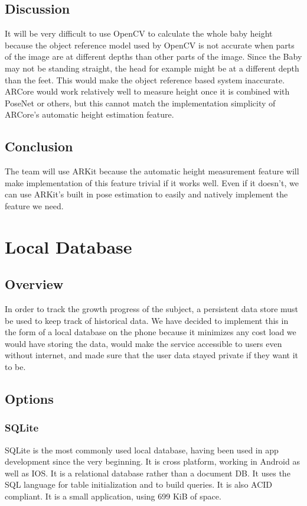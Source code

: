 \documentclass[onecolumn, draftclsnofoot,10pt, compsoc]{IEEEtran}
\begin{document}
\subsection{Discussion}
It will be very difficult to use OpenCV to calculate the whole baby height because the object reference model used by OpenCV is not accurate when parts of the image are at different depths than other parts of the image. Since the Baby may not be standing straight, the head for example might be at a different depth than the feet. This would make the object reference based system inaccurate. ARCore would work relatively well to measure height once it is combined with PoseNet or others, but this cannot match the implementation simplicity of ARCore's automatic height estimation feature.

\subsection{Conclusion}
The team will use ARKit because the automatic height measurement feature will make implementation of this feature trivial if it works well. Even if it doesn't, we can use ARKit's built in pose estimation to easily and natively implement the feature we need.

\section{Local Database}

\subsection{Overview}
In order to track the growth progress of the subject, a persistent data store must be used to keep track of historical data. We have decided to implement this in the form of a local database on the phone because it minimizes any cost load we would have storing the data, would make the service accessible to users even without internet, and made sure that the user data stayed private if they want it to be.\\

\subsection{Options}
\subsubsection{SQLite}
SQLite is the most commonly used local database, having been used in app development since the very beginning. It is cross platform, working in Android as well as IOS. It is a relational database rather than a document DB. It uses the SQL language for table initialization and to build queries. It is also ACID compliant. It is a small application, using 699 KiB of space.
\end{document}
